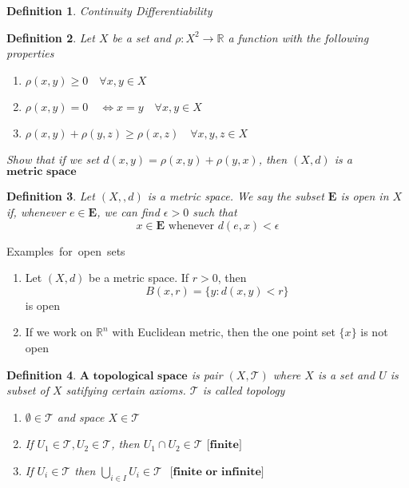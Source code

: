 \documentclass{article} \usepackage{amsmath} \usepackage{amsfonts}
\begin{document}
\newtheorem{theorem}{Theorem}[section]
\newtheorem{defn}{Definition}[section]

\begin{defn}
Continuity
Differentiability
\end{defn}

\begin{defn}
Let $X$ be a set and $\rho: X^2 \rightarrow \mathbb{R}$ a function with the following properties
    \begin{enumerate}
        \item  $\rho(x, y) \geq 0 \quad \forall x, y \in X$ 
        \item  $\rho(x, y) = 0 \quad \iff x = y \quad \forall x, y \in X$ 
        \item  $\rho(x, y) + \rho(y, z) \geq \rho(x, z) \quad \forall x, y, z \in X$ 
    \end{enumerate}
Show that if we set $d(x, y) = \rho(x, y) + \rho(y, x)$, then $(X, d)$ is a $\textbf{metric space}$
\end{defn}

\begin{defn}
Let $(X,, d)$ is a metric space. We say the subset $\mathbf{E}$ is open in $X$ if, whenever $e \in \mathbf{E}$, we can find $\epsilon > 0$ such that
\[ x \in \mathbf{E} \mbox{ whenever } d(e, x) < \epsilon \]
\end{defn}

\noindent
\mbox{Examples for open sets}
\begin{enumerate}
    \item Let $(X, d)$ be a metric space. If $r > 0$, then
    \[ B(x, r) = \{ y: d(x, y) < r \}\]
    is open
    \item If we work on $\mathbb{R}^n$ with Euclidean metric, then the one point set $\{x\}$ is not open 
\end{enumerate}





\begin{defn}
    $\textbf{A topological space}$ is pair $(X, \mathcal{T})$ where $X$ is a set and $U$ is subset of $X$ satifying certain axioms. $\mathcal{T}$ is called topology
    \begin{enumerate}
        \item $\emptyset \in \mathcal{T}$ and space $X \in \mathcal{T}$ 
        \item If $U_1 \in \mathcal{T}, U_2 \in \mathcal{T}$, then $U_1 \cap U_2 \in \mathcal{T}$ $\textbf{[finite]}$ 
        \item If $U_i \in \mathcal{T}$ then $\bigcup_{i \in I} U_i \in \mathcal{T}$ $\textbf{ [finite or infinite]}$ 
    \end{enumerate}
\end{defn}
\end{document}
